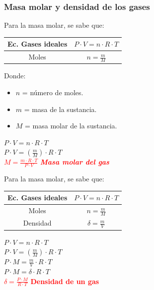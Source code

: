         \subsubsection{Masa molar y densidad de los gases}
            \sangria{} Para la masa molar, se sabe que:
            \begin{center}
                \begin{tabular}{| c | c |}
                    \hline
                    Ec. Gases ideales & $P \cdot V = n \cdot R \cdot T$ \\
                    \hline
                    Moles & $n = \frac{m}{M}$ \\
                    \hline
                \end{tabular}
            \end{center}
            \sangria{} Donde:
            \begin{itemize}
                \item $n$ = número de moles.
                \item $m$ = masa de la sustancia.
                \item $M$ = masa molar de la sustancia.
            \end{itemize}
            \begin{center}
                $P \cdot V = n \cdot R \cdot T$ \\[5pt]
                $P \cdot V = (\frac{m}{M}) \cdot R \cdot T$ \\[5pt]
                \textcolor{red}{\textbf{$M = \frac{m \cdot R \cdot T}{P \cdot V}$} \hspace{15pt} \textit{\textbf{Masa molar del gas}}}
            \end{center}
            \columnbreak{}
            \sangria{} Para la masa molar, se sabe que:
            \begin{center}
                \begin{tabular}{| c | c |}
                    \hline
                    Ec. Gases ideales & $P \cdot V = n \cdot R \cdot T$ \\
                    \hline
                    Moles & $n = \frac{m}{M}$ \\
                    \hline
                    Densidad & $\delta = \frac{m}{V}$ \\
                    \hline
                \end{tabular}
            \end{center}
            \begin{center}
                $P \cdot V = n \cdot R \cdot T$ \\[5pt]
                $P \cdot V = (\frac{m}{M}) \cdot R \cdot T$ \\[5pt]
                $P \cdot M = \frac{m}{V} \cdot R \cdot T$ \\[5pt]
                $P \cdot M = \delta \cdot R \cdot T$ \\[5pt]
                \textcolor{red}{\textbf{$\delta = \frac{P \cdot M}{R \cdot T}$} \hspace{15pt} \textbf{Densidad de un gas}}
            \end{center}
